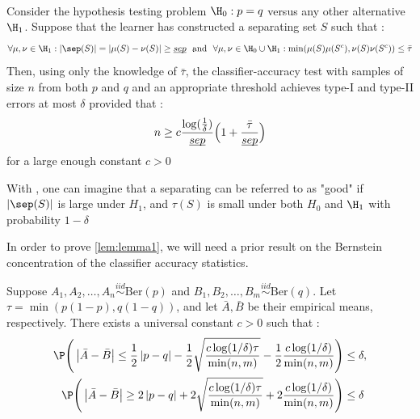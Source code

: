 \begin{lemma}\label{lem:lemma1}\citet[Lemma~1]{gerberclas}\\
    Consider the hypothesis testing problem $\H_0 : p = q$ versus any other alternative $\H_1$. Suppose that the learner has constructed a separating set $S$ such that : 
    \begin{equation*}
        \forall \mu,\nu \in \H_1 : \left|\sep(S)\right| = \left|\mu(S)-\nu(S)\right| \geq \underbar{$sep$} \ \text{ and }\ \forall\mu,\nu \in \H_0 \cup \H_1 : \min(\mu(S)\mu(S^c),\nu(S)\nu(S^c)) \leq \bar{\tau}
    \end{equation*}
    Then, using only the knowledge of $\bar{\tau}$, the classifier-accuracy test with samples of size $n$ from both $p$ and $q$ and an appropriate threshold achieves type-I and type-II errors at most $\delta$ provided that : 
    \begin{equation*}
        n \geq c\frac{\log(\frac{1}{\delta})}{\underbar{$sep$}}\Bigl(1+ \frac{\bar{\tau}}{\underbar{$sep$}}\Bigr)
    \end{equation*}
    for a large enough constant $c >0$
\end{lemma}
\begin{remark}
With , one can imagine that a separating can be referred to as "good" if $\left|\sep(S)\right|$ is large under $H_1$, and $\tau(S)$ is small under both $H_0$ and $\H_1$ with probability $1-\delta$
\end{remark}
In order to prove \cref{lem:lemma1}, we will need a prior result on the Bernstein concentration of the classifier accuracy statistics. 
\begin{lemma}\label{lem:lemma2} \citet[Lemma~8]{gerberclas}
Suppose $A_1,A_2,\dots,A_n \overset{iid}{\sim}\text{Ber}(p)$ and $B_1,B_2,\dots,B_m \overset{iid}{\sim} \text{Ber}(q)$. Let $\tau = \min(p(1-p),q(1-q))$, and let $\bar{A},\bar{B}$ be their empirical means, respectively. There exists a universal constant $c>0$ such that :
\begin{equation*}
    \begin{aligned}
        \P\Bigg(\left|\bar{A}-\bar{B}\right|\leq \frac{1}{2}\left|p-q\right| -\frac{1}{2}\sqrt{\frac{c\log(1/\delta)\tau}{\min(n,m)}} -\frac{1}{2}\frac{c\log(1/\delta)}{\min(n,m)} \Bigg) &\leq \delta, \\
        \P\Bigg(\left|\bar{A}-\bar{B}\right|\geq 2\left|p-q\right| + 2\sqrt{\frac{c\log(1/\delta)\tau}{\min(n,m)}} + 2\frac{c\log(1/\delta)}{\min(n,m)} \Bigg) &\leq \delta
    \end{aligned}
\end{equation*} 
\end{lemma}
